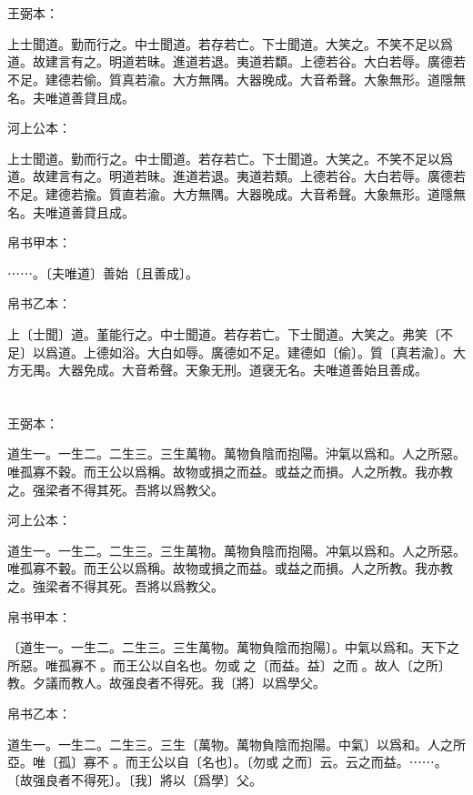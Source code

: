 \documentclass[a5paper]{ctexbook}
\begin{document}
    \chapter{}
    王弼本：

    上士聞道。勤而行之。中士聞道。若存若亡。下士聞道。大笑之。不笑不足以爲道。故建言有之。明道若昧。進道若退。夷道若纇。上德若谷。大白若辱。廣德若不足。建德若偷。質真若渝。大方無隅。大器晚成。大音希聲。大象無形。道隱無名。夫唯道善貸且成。

    河上公本：

    上士聞道。勤而行之。中士聞道。若存若亡。下士聞道。大笑之。不笑不足以爲道。故建言有之。明道若昧。進道若退。夷道若類。上德若谷。大白若辱。廣德若不足。建德若揄。質直若渝。大方無隅。大器晚成。大音希聲。大象無形。道隱無名。夫唯道善貸且成。

    帛书甲本：

    ⋯⋯。〔夫唯道〕善始〔且善成〕。

    帛书乙本：

    上〔士聞〕道。堇能行之。中士聞道。若存若亡。下士聞道。大笑之。弗笑〔不足〕以爲道。上德如浴。大白如辱。廣德如不足。建德如〔偷〕。質〔真若渝〕。大方无禺。大器免成。大音希聲。天象无刑。道襃无名。夫唯道善始且善成。

    \chapter{}
    王弼本：

    道生一。一生二。二生三。三生萬物。萬物負陰而抱陽。沖氣以爲和。人之所惡。唯孤寡不穀。而王公以爲稱。故物或損之而益。或益之而損。人之所教。我亦教之。强梁者不得其死。吾將以爲教父。

    河上公本：

    道生一。一生二。二生三。三生萬物。萬物負陰而抱陽。冲氣以爲和。人之所惡。唯孤寡不轂。而王公以爲稱。故物或損之而益。或益之而損。人之所教。我亦教之。強梁者不得其死。吾將以爲教父。

    帛书甲本：

    〔道生一。一生二。二生三。三生萬物。萬物負陰而抱陽〕。中氣以爲和。天下之所惡。唯孤寡不𥞤。而王公以自名也。勿或𢿃之〔而益。益〕之而𢿃。故人〔之所〕教。夕議而教人。故强良者不得死。我〔將〕以爲學父。

    帛书乙本：

    道生一。一生二。二生三。三生〔萬物。萬物負陰而抱陽。中氣〕以爲和。人之所亞。唯〔孤〕寡不𥞤。而王公以自〔名也〕。〔勿或𢿃之而〕云。云之而益。⋯⋯。〔故强良者不得死〕。〔我〕將以〔爲學〕父。
\end{document}
